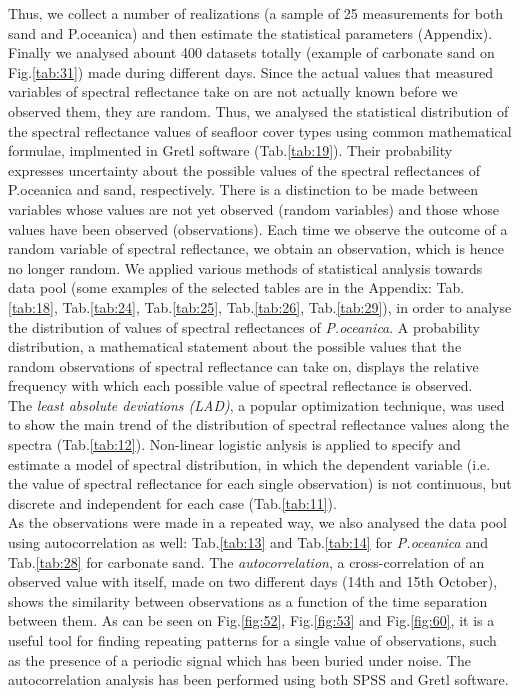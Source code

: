 \documentclass[10pt, a4paper]{article}
\begin{document}
Thus, we collect a number of realizations (a sample of 25 measurements for both sand and P.oceanica) and then estimate the statistical parameters (Appendix). \\
Finally we analysed abount 400 datasets totally (example of carbonate sand on Fig.\ref{tab:31}) made during different days. 
Since the actual values that measured variables of spectral reflectance take on are not actually known before we observed them, they are random. 
Thus, we analysed the statistical distribution of the spectral reflectance values of seafloor cover types using common mathematical formulae, implmented in Gretl software (Tab.\ref{tab:19}). 
Their probability expresses uncertainty about the possible values of the spectral reflectances  of P.oceanica and sand, respectively.
There is a distinction to be made between variables whose values are not yet observed (random variables) and those whose values have been observed (observations). 
Each time we observe the outcome of a random variable of spectral reflectance, we obtain an observation, which is hence no longer random. 
We applied various methods of statistical analysis towards data pool (some examples of the selected tables are in the Appendix: Tab.\ref{tab:18}, Tab.\ref{tab:24}, Tab.\ref{tab:25}, Tab.\ref{tab:26}, Tab.\ref{tab:29}), in order to analyse the distribution of values of spectral reflectances of \textit{P.oceanica}. 
A probability distribution, a mathematical statement about the possible values that the random observations of spectral reflectance can take on, displays the relative frequency with which each possible value of spectral reflectance is observed. \\
The \textit{least absolute deviations (LAD)}, a popular optimization technique, was used to show the main trend of the distribution of spectral reflectance values along the spectra (Tab.\ref{tab:12}). Non-linear logistic anlysis is applied to specify and estimate a model of spectral distribution, in which the dependent variable (i.e. the value of spectral reflectance for each single observation) is not continuous, but discrete and independent for each case (Tab.\ref{tab:11}). \\
As the observations were made in a repeated way, we also analysed the data pool using autocorrelation as well: Tab.\ref{tab:13} and Tab.\ref{tab:14} for \textit{P.oceanica} and Tab.\ref{tab:28} for carbonate sand. The \textit{autocorrelation}, a cross-correlation of an observed value with itself, made on two different days (14th and 15th October),
 shows the similarity between observations as a function of the time separation between them. As can be seen on Fig.\ref{fig:52}, Fig.\ref{fig:53} and Fig.\ref{fig:60}, it is a useful tool for finding repeating patterns for a single value of observations, such as the presence of a periodic signal which has been buried under noise. The autocorrelation analysis has been performed using both SPSS and Gretl software. \\
\end{document}
